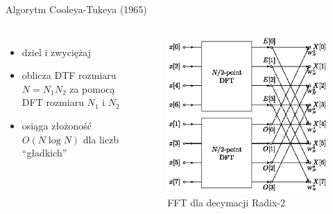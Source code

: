 \documentclass[polish, 12pt, aspectratio=169]{beamer}
\begin{document}
\begin{frame}{Algorytm Cooleya-Tukeya (1965)}
    \begin{columns}
        \begin{itemize}
            \setlength\itemsep{1em}
            \item dziel i zwyciężaj
            \item oblicza DTF rozmiaru \( N = N_1 N_2 \) za pomocą DFT rozmiaru \( N_1 \) i \( N_2 \)
            \item osiąga złożoność \( O(N \log N) \) dla liczb \enquote{gładkich}
        \end{itemize}
    \pause{}
        \vspace{1em}
        \begin{figure}
            \includegraphics[width=0.9\linewidth]{img/fft-diagram.eps}
            \caption*{FFT dla decymacji Radix-2}
        \end{figure}
    \end{columns}
\end{frame}

\end{document}
